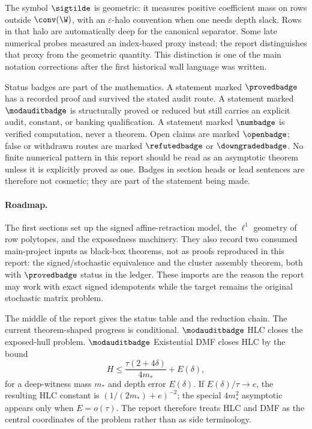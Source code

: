 The symbol \(\sigtilde\) is geometric: it measures positive coefficient mass
on rows outside \(\conv(\W)\), with an \(\varepsilon\)-halo convention when
one needs depth slack.  Rows in that halo are automatically deep for the
canonical separator.  Some late numerical probes measured an index-based proxy
instead; the report distinguishes that proxy from the geometric quantity.
This distinction is one of the main notation corrections after the first
historical wall language was written.

Status badges are part of the mathematics.  A statement marked
\(\provedbadge\) has a recorded proof and survived the stated audit route.
A statement marked \(\modauditbadge\) is structurally proved or reduced but
still carries an explicit audit, constant, or banking qualification.
A statement marked \(\numbadge\) is verified computation, never a theorem.
Open claims are marked \(\openbadge\); false or withdrawn routes are marked
\(\refutedbadge\) or \(\downgradedbadge\).  No finite numerical pattern in this
report should be read as an asymptotic theorem unless it is explicitly proved
as one.  Badges in section heads or lead sentences are therefore not cosmetic;
they are part of the statement being made.

\paragraph{Roadmap.}
The first sections set up the signed affine-retraction model, the
\(\ell^1\) geometry of row polytopes, and the exposedness machinery.  They
also record two consumed main-project inputs as black-box theorems, not as
proofs reproduced in this report: the signed/stochastic equivalence and the
cluster assembly theorem, both with \(\provedbadge\) status in the ledger.
These imports are the reason the report may work with exact signed
idempotents while the target remains the original stochastic matrix problem.

The middle of the report gives the status table and the reduction chain.  The
current theorem-shaped progress is conditional.  \(\modauditbadge\)
HLC closes the exposed-hull problem.  \(\modauditbadge\) Existential DMF closes
HLC by the bound
\[
  H \leq \frac{\tau(2+4\delta)}{4m_*}+E(\delta),
\]
for a deep-witness mass \(m_*\) and depth error \(E(\delta)\).  If
\(E(\delta)/\tau\to e\), the resulting HLC constant is
\((1/(2m_*)+e)^{-2}\); the special \(4m_*^2\) asymptotic appears only when
\(E=o(\tau)\).  The report therefore treats HLC and DMF as the central
coordinates of the problem rather than as side terminology.

